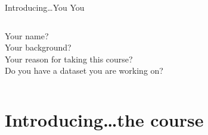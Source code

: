 \documentclass[handout]{beamer}
\begin{document}
\begin{frame}{Introducing\ldots \huge{You}}
	{\huge{You}}
	\small{}
	\begin{columns}
		Your name?\\
		Your background?\\
		Your reason for taking this course?\\
		Do you have a dataset you are working on?
	\end{columns}
\end{frame}


\section{Introducing\ldots the course}
\end{document}
